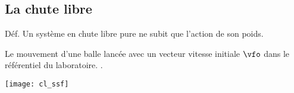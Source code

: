 \documentclass[../main/main.tex]{subfiles}
\begin{document}
\subsection{La chute libre}
\begin{rdefi}{Déf.}
    Un système en chute libre pure ne subit que l'action de son poids.
\end{rdefi}

\hspace*{-.75cm}
\begin{minipage}{0.65\linewidth}
    \begin{enumerate}[label=\sqenumi]
         Le mouvement d'une balle lancée avec un
            vecteur vitesse initiale $\vfo$ dans le référentiel du laboratoire.
        . \bigbreak
    \end{enumerate}
\end{minipage}
\hfill
\begin{minipage}{0.30\linewidth}
    \begin{center}
        \texttt{[image: cl\_ssf]}
    \end{center}
\end{minipage}
\end{document}

